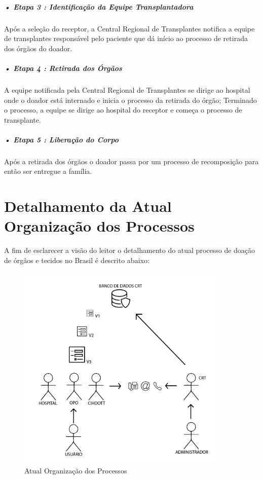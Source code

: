 \documentclass[portuguese,oneside]{tcc}
\begin{document}
\subparagraph{• Etapa 3 : Identificação da Equipe Transplantadora}
Após a seleção do receptor, a Central Regional de Transplantes notifica a equipe de transplantes responsável pelo paciente que dá início ao processo de retirada dos órgãos do doador.

\subparagraph{• Etapa 4 : Retirada dos Órgãos}
A equipe notificada pela Central Regional de Transplantes se dirige ao hospital onde o doador está internado e inicia o processo da retirada do órgão; Terminado o processo, a equipe se dirige ao hospital do receptor e começa o processo de transplante.

\subparagraph{• Etapa 5 : Liberação do Corpo}
Após a retirada dos órgãos o doador passa por um processo de recomposição para então ser entregue a família.


\section{Detalhamento da Atual Organização dos Processos}  \label{tab:detalhamento-atual}
A fim de esclarecer a visão do leitor o detalhamento do atual processo de doação de órgãos e tecidos no Brasil é descrito abaixo:

\begin{figure}[htp]
\centering
\caption{Atual Organização dos Processos}
\includegraphics[width=10cm]{processo-rudimentar}

\label{fig:processo-rudimentar}
\end{figure}
\end{document}
